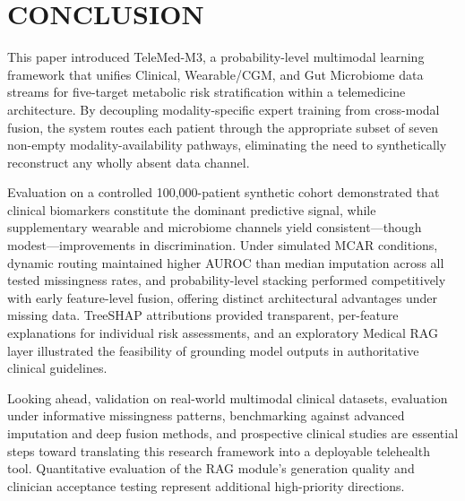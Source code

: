 \documentclass[10pt,twocolumn,letterpaper]{article}
\begin{document}
\section{CONCLUSION}
This paper introduced TeleMed-M3, a probability-level multimodal learning framework that unifies Clinical, Wearable/CGM, and Gut Microbiome data streams for five-target metabolic risk stratification within a telemedicine architecture. By decoupling modality-specific expert training from cross-modal fusion, the system routes each patient through the appropriate subset of seven non-empty modality-availability pathways, eliminating the need to synthetically reconstruct any wholly absent data channel.

Evaluation on a controlled 100{,}000-patient synthetic cohort demonstrated that clinical biomarkers constitute the dominant predictive signal, while supplementary wearable and microbiome channels yield consistent---though modest---improvements in discrimination. Under simulated MCAR conditions, dynamic routing maintained higher AUROC than median imputation across all tested missingness rates, and probability-level stacking performed competitively with early feature-level fusion, offering distinct architectural advantages under missing data. TreeSHAP attributions provided transparent, per-feature explanations for individual risk assessments, and an exploratory Medical RAG layer illustrated the feasibility of grounding model outputs in authoritative clinical guidelines.

Looking ahead, validation on real-world multimodal clinical datasets, evaluation under informative missingness patterns, benchmarking against advanced imputation and deep fusion methods, and prospective clinical studies are essential steps toward translating this research framework into a deployable telehealth tool. Quantitative evaluation of the RAG module's generation quality and clinician acceptance testing represent additional high-priority directions.
\end{document}
